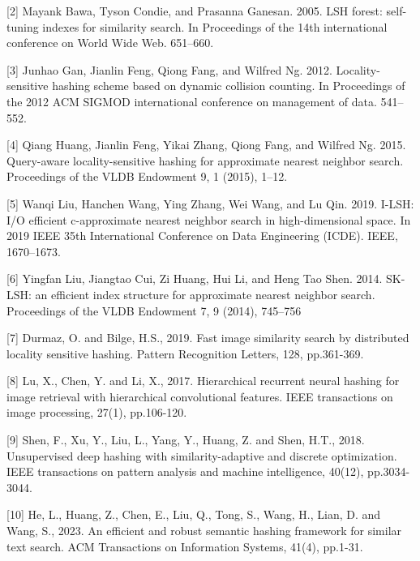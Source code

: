 \documentclass{article}
\begin{document}
[2] Mayank Bawa, Tyson Condie, and Prasanna Ganesan. 2005. LSH forest: self-tuning indexes for similarity search. In Proceedings of the 14th international conference on World Wide Web. 651–660.

[3] Junhao Gan, Jianlin Feng, Qiong Fang, and Wilfred Ng. 2012. Locality-sensitive hashing scheme based on dynamic collision counting. In Proceedings of the 2012 ACM SIGMOD international conference on management of data. 541–552.

[4] Qiang Huang, Jianlin Feng, Yikai Zhang, Qiong Fang, and Wilfred Ng. 2015. Query-aware locality-sensitive hashing for approximate nearest neighbor search. Proceedings of the VLDB Endowment 9, 1 (2015), 1–12.

[5] Wanqi Liu, Hanchen Wang, Ying Zhang, Wei Wang, and Lu Qin. 2019. I-LSH: I/O efficient c-approximate nearest neighbor search in high-dimensional space. In 2019 IEEE 35th International Conference on Data Engineering (ICDE). IEEE, 1670–1673.

[6] Yingfan Liu, Jiangtao Cui, Zi Huang, Hui Li, and Heng Tao Shen. 2014. SK-LSH: an efficient index structure for approximate nearest neighbor
search. Proceedings of the VLDB Endowment 7, 9 (2014), 745–756

[7] Durmaz, O. and Bilge, H.S., 2019. Fast image similarity search by distributed locality sensitive hashing. Pattern Recognition Letters, 128, pp.361-369.

[8] Lu, X., Chen, Y. and Li, X., 2017. Hierarchical recurrent neural hashing for image retrieval with hierarchical convolutional features. IEEE transactions on image processing, 27(1), pp.106-120.

[9] Shen, F., Xu, Y., Liu, L., Yang, Y., Huang, Z. and Shen, H.T., 2018. Unsupervised deep hashing with similarity-adaptive and discrete optimization. IEEE transactions on pattern analysis and machine intelligence, 40(12), pp.3034-3044.

[10] He, L., Huang, Z., Chen, E., Liu, Q., Tong, S., Wang, H., Lian, D. and Wang, S., 2023. An efficient and robust semantic hashing framework for similar text search. ACM Transactions on Information Systems, 41(4), pp.1-31.
\end{document}
